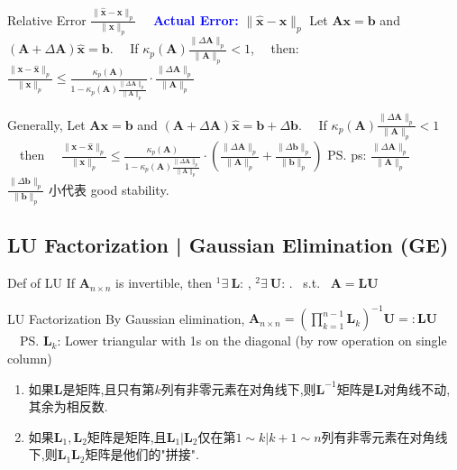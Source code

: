\documentclass{note}
\begin{document}
\vspace{-3pt}
\begin{MyTh}{Relative Error}
  {\footnotesize $\frac{\|\widehat{\mathbf{x}} - \mathbf{x}\|_p}{\|\mathbf{x}\|_p}$ \ \ \textcolor{blue}{\textbf{Actual Error:}} $\|\widehat{\mathbf{x}} - \mathbf{x}\|_p$ \quad Let $\mathbf{Ax}=\mathbf{b}$ and $(\mathbf{A} + \Delta \mathbf{A})\widehat{\mathbf{x}} = \mathbf{b}$. \ \ If $\kappa_p(\mathbf{A})\frac{\|\Delta \mathbf{A}\|_p}{\|\mathbf{A}\|_p}<1$, \ \ then: \ \ {\tiny $\frac{\|\mathbf{x}-\widehat{\mathbf{x}}\|_p}{\|\mathbf{x}\|_p}\leq\frac{\kappa_p(\mathbf{A})}{1-\kappa_p(\mathbf{A})\frac{\|\Delta \mathbf{A}\|_p}{\|\mathbf{A}\|_p}}\cdot\frac{\|\Delta \mathbf{A}\|_p}{\|\mathbf{A}\|_p}$}}
  
  \vspace{-8pt}
  {\quad \scriptsize Generally, Let $\mathbf{Ax}=\mathbf{b}$ and $(\mathbf{A} + \Delta \mathbf{A})\widehat{\mathbf{x}} = \mathbf{b} + \Delta\mathbf{b}$. \ \ If $\kappa_p(\mathbf{A})\frac{\|\Delta \mathbf{A}\|_p}{\|\mathbf{A}\|_p}<1$ \ \ then \ \ $\frac{\|\mathbf{x}-\widehat{\mathbf{x}}\|_p}{\|\mathbf{x}\|_p}\leq\frac{\kappa_p(\mathbf{A})}{1-\kappa_p(\mathbf{A})\frac{\|\Delta \mathbf{A}\|_p}{\|\mathbf{A}\|_p}}\cdot(\frac{\|\Delta \mathbf{A}\|_p}{\|\mathbf{A}\|_p}+\frac{\|\Delta \mathbf{b}\|_p}{\|\mathbf{b}\|_p})$} \qquad\qquad\qquad\qquad\qquad\quad \ps{\tiny ps: $\frac{\|\Delta \mathbf{A}\|_p}{\|\mathbf{A}\|_p}$ \ \ $\frac{\|\Delta \mathbf{b}\|_p}{\|\mathbf{b}\|_p}$ 小代表 good stability.}
\end{MyTh}
\vspace{-7pt}


\subsection{LU Factorization | Gaussian Elimination (GE)}

\begin{MyTh}{Def of LU}
    If $\mathbf{A}_{n\times n}$ is invertible, then $^1\exists \ \mathbf{L}$: , $^2\exists \ \mathbf{U}$: . \ s.t. \ $\mathbf{A}=\mathbf{L}\mathbf{U}$ 
\end{MyTh}

\begin{MyTh}{LU Factorization}
    By Gaussian elimination, $\mathbf{A}_{n\times n}=(\prod_{k=1}^{n-1}\mathbf{L}_k)^{-1}\mathbf{U}=:\mathbf{L}\mathbf{U}$ \ \ \ps{$\mathbf{L}_k$: Lower triangular with 1s on the diagonal (by row operation on single column)}
    
    \begin{enumerate}
        \item 如果$\mathbf{L}$是矩阵,且只有第$k$列有非零元素在对角线下,则$\mathbf{L}^{-1}$矩阵是$\mathbf{L}$对角线不动,其余为相反数.
        \item 如果$\mathbf{L}_1,\mathbf{L}_2$矩阵是矩阵,且$\mathbf{L}_1|\mathbf{L}_2$仅在第$1\sim k|k+1\sim n$列有非零元素在对角线下,则$\mathbf{L}_1\mathbf{L}_2$矩阵是他们的"拼接".
    \end{enumerate}
    \vspace{5pt}
\end{MyTh}
\end{document}
